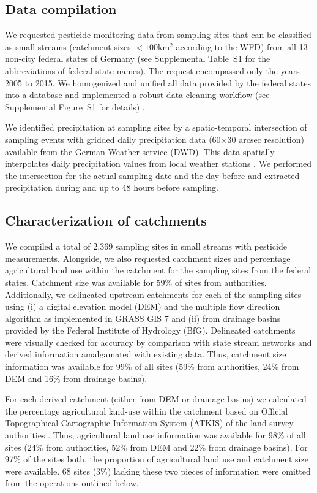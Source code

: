 \documentclass[journal=esthag,manuscript=article]{achemso}
\begin{document}
\subsection{Data compilation}
We requested pesticide monitoring data from sampling sites that can be classified as small streams (catchment sizes $\mathrm{< 100km^2}$ according to the WFD) from all 13 non-city federal states of Germany (see Supplemental Table~S1 for the abbreviations of federal state names). 
The request encompassed only the years 2005 to 2015.
We homogenized and unified all data provided by the federal states into a database and implemented a robust data-cleaning workflow (see Supplemental Figure~S1 for details) \citep{poisot_best_2015}.

We identified precipitation at sampling sites by a spatio-temporal intersection of sampling events with gridded daily precipitation data (60$\times$30 arcsec resolution) available from the German Weather service (DWD).
This data spatially interpolates daily precipitation values from local weather stations \citep{rauthe_central_2013}. 
We performed the intersection for the actual sampling date and the day before and extracted precipitation during and up to 48 hours before sampling. 


\subsection{Characterization of catchments}
We compiled a total of 2,369 sampling sites in small streams with pesticide measurements. %
Alongside, we also requested catchment sizes and percentage agricultural land use within the catchment for the sampling sites from the federal states. %
Catchment size was available for 59\% of sites from authorities. 
Additionally, we delineated upstream catchments for each of the sampling sites using (i) a digital elevation model (DEM) \citep{eea_digital_2013} and the multiple flow direction algorithm \citep{holmgren_multiple_1994} as implemented in GRASS GIS 7 \citep{neteler_grass_2012} and (ii) from drainage basins provided by the Federal Institute of Hydrology (BfG).
Delineated catchments were visually checked for accuracy by comparison with state stream networks and derived information amalgamated with existing data.
Thus, catchment size information was available for 99\% of all sites (59\% from authorities, 24\% from DEM and 16\% from drainage basins). 

For each derived catchment (either from DEM or drainage basins) we calculated the percentage agricultural land-use within the catchment based on Official Topographical Cartographic Information System (ATKIS) of the land survey authorities \citep{adv_atkis_2016}. 
Thus, agricultural land use information was available for 98\% of all sites (24\% from authorities, 52\% from DEM and 22\% from drainage basins). 
For 97\% of the sites both, the proportion of agricultural land use and catchment size were available. 
68 sites (3\%) lacking these two pieces of information were omitted from the operations outlined below.
\end{document}
